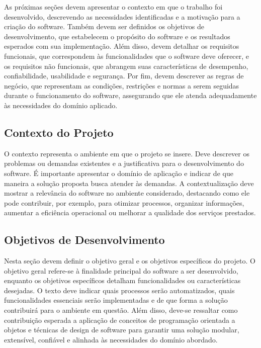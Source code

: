 \documentclass{article}
\begin{document}
As próximas seções devem apresentar o contexto em que o trabalho foi desenvolvido, descrevendo as necessidades identificadas e a motivação para a criação do software. Também devem ser definidos os objetivos de desenvolvimento, que estabelecem o propósito do software e os resultados esperados com sua implementação. Além disso, devem detalhar os requisitos funcionais, que correspondem às funcionalidades que o software deve oferecer, e os requisitos não funcionais, que abrangem suas características de desempenho, confiabilidade, usabilidade e segurança. Por fim, devem descrever as regras de negócio, que representam as condições, restrições e normas a serem seguidas durante o funcionamento do software, assegurando que ele atenda adequadamente às necessidades do domínio aplicado.

\subsection{Contexto do Projeto}

O contexto representa o ambiente em que o projeto se insere. Deve descrever os problemas ou demandas existentes e a justificativa para o desenvolvimento do software. É importante apresentar o domínio de aplicação e indicar de que maneira a solução proposta busca atender às demandas. A contextualização deve mostrar a relevância do software no ambiente considerado, destacando como ele pode contribuir, por exemplo, para otimizar processos, organizar informações, aumentar a eficiência operacional ou melhorar a qualidade dos serviços prestados.

\subsection{Objetivos de Desenvolvimento}

Nesta seção devem definir o objetivo geral e os objetivos específicos do projeto. O objetivo geral refere-se à finalidade principal do software a ser desenvolvido, enquanto os objetivos específicos detalham funcionalidades ou características desejadas. O texto deve indicar quais processos serão automatizados, quais funcionalidades essenciais serão implementadas e de que forma a solução contribuirá para o ambiente em questão. Além disso, deve-se ressaltar como contribuição esperada a aplicação de conceitos de programação orientada a objetos e técnicas de design de software para garantir uma solução modular, extensível, confiável e alinhada às necessidades do domínio abordado.
\end{document}

